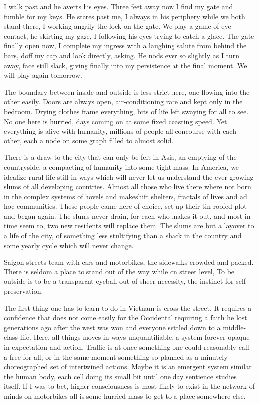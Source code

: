 \documentclass[ebook, 10pt, openright, onecolumn]{memoir}
\begin{document}
I walk past and he averts his eyes.  Three feet away now I find my gate and
fumble for my keys.  He stares past me, I always in his periphery while we both
stand there, I working angrily the lock on the gate.  We play a game of eye
contact, he skirting my gaze, I following his eyes trying to catch a glace.  The
gate finally open now, I complete my ingress with a laughing salute from behind the
bars, doff my cap and look directly, asking.  He nods ever so slightly as I turn
away, face still slack, giving finally into my persistence at the final
moment.  We will play again tomorrow. 

The boundary between inside and outside is less strict here, one flowing into
the other easily.  Doors are always open, air-conditioning rare and kept only in
the bedroom.  Drying clothes frame everything, bits of life left swaying for all
to see.  No one here is hurried, days coming on at some fixed coasting
speed. Yet everything is alive with humanity, millions of people all 
concourse with each other, each a node on some graph filled to almost solid.

There is a draw to the city that can only be felt in Asia, an emptying of the
countryside, a compacting of humanity into some tight mass.  In America, we
idealize rural life still in ways which will never let us understand the ever
growing slums of all developing countries.  Almost all those who live there
where not born in the complex systems of hovels and makeshift shelters, 
fractals of lives and ad hoc communities.  These people came here of choice, set
up their tin roofed plot and began again.  The slums never drain, for each who
makes it out, and most in time seem to, two new residents will replace them.
The slums are but a layover to a life of the city, of something less stultifying
than a shack in the country and some yearly cycle which will never change.

Saigon streets team with cars and motorbikes, the sidewalks crowded and packed.
There is seldom a place to stand out of the way while on street level, To be
outside is to be a transparent eyeball out of sheer necessity, the instinct for
self-preservation.

The first thing one has to learn to do in Vietnam is cross the street.  It
requires a confidence that does not come easily for the Occidental requiring a
faith he lost generations ago after the west was won and everyone settled down
to a middle-class life.  Here, all things moves in ways unquantifiable, a system
forever opaque in expectation and action.  Traffic is at once something one
could reasonably call a free-for-all, or in the same moment something so planned
as a minutely choreographed set of intertwined actions.  Maybe it is an emergent
system similar the human body, each cell doing its small bit until one day
sentience studies itself.  If I was to bet, higher consciousness is most likely
to exist in the network of minds on motorbikes all is some hurried mass to get
to a place somewhere else.
\end{document}
